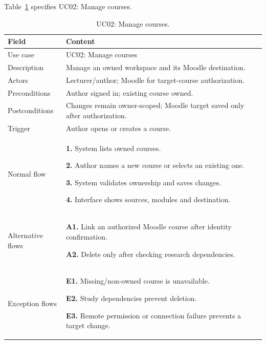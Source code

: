 \needspace{.39\textheight}
Table~\ref{tab:uc-02} specifies UC02: Manage courses.
\begin{table}[H]\centering\footnotesize{}\renewcommand{\arraystretch}{1.05}
\caption{UC02: Manage courses.}\label{tab:uc-02}
\begin{tabular}{|p{2.8cm}|p{11.9cm}|}\hline
\textbf{Field} & \textbf{Content}\\\hline
Use case & UC02: Manage courses\\\hline
Description & Manage an owned workspace and its Moodle destination.\\\hline
Actors & Lecturer/author; Moodle for target-course authorization.\\\hline
Preconditions & Author signed in; existing course owned.\\\hline
Postconditions & Changes remain owner-scoped; Moodle target saved only after authorization.\\\hline
Trigger & Author opens or creates a course.\\\hline
Normal flow & \textbf{1.} System lists owned courses.\par \textbf{2.} Author names a new course or selects an existing one.\par \textbf{3.} System validates ownership and saves changes.\par \textbf{4.} Interface shows sources, modules and destination.\\\hline
Alternative flows & \textbf{A1.} Link an authorized Moodle course after identity confirmation.\par \textbf{A2.} Delete only after checking research dependencies.\\\hline
Exception flows & \textbf{E1.} Missing/non-owned course is unavailable.\par \textbf{E2.} Study dependencies prevent deletion.\par \textbf{E3.} Remote permission or connection failure prevents a target change.\\\hline
\end{tabular}\end{table}

